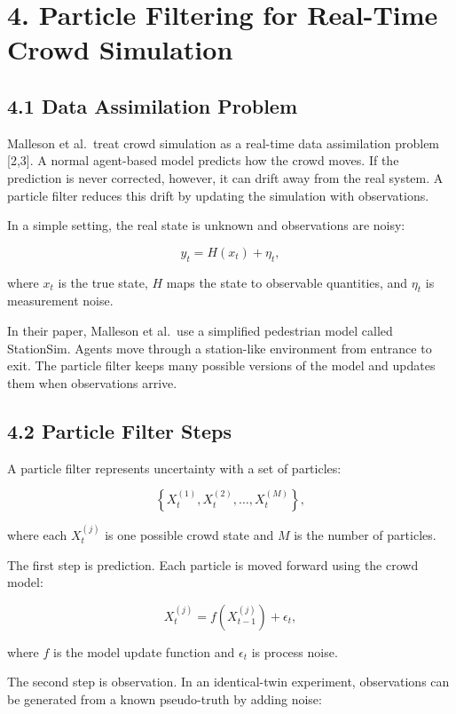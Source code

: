 \documentclass[
  11pt,
]{article}
\begin{document}
\section{4. Particle Filtering for Real-Time Crowd
Simulation}\label{particle-filtering-for-real-time-crowd-simulation}

\subsection{4.1 Data Assimilation
Problem}\label{data-assimilation-problem}

Malleson et al.~treat crowd simulation as a real-time data assimilation
problem {[}2,3{]}. A normal agent-based model predicts how the crowd
moves. If the prediction is never corrected, however, it can drift away
from the real system. A particle filter reduces this drift by updating
the simulation with observations.

In a simple setting, the real state is unknown and observations are
noisy:

\[
y_t = H(x_t) + \eta_t,
\]

where \(x_t\) is the true state, \(H\) maps the state to observable
quantities, and \(\eta_t\) is measurement noise.

In their paper, Malleson et al.~use a simplified pedestrian model called
StationSim. Agents move through a station-like environment from entrance
to exit. The particle filter keeps many possible versions of the model
and updates them when observations arrive.

\subsection{4.2 Particle Filter Steps}\label{particle-filter-steps}

A particle filter represents uncertainty with a set of particles:

\[
\left\{X_t^{(1)}, X_t^{(2)}, \ldots, X_t^{(M)}\right\},
\]

where each \(X_t^{(j)}\) is one possible crowd state and \(M\) is the
number of particles.

The first step is prediction. Each particle is moved forward using the
crowd model:

\[
X_t^{(j)} = f(X_{t-1}^{(j)}) + \epsilon_t,
\]

where \(f\) is the model update function and \(\epsilon_t\) is process
noise.

The second step is observation. In an identical-twin experiment,
observations can be generated from a known pseudo-truth by adding noise:
\end{document}
